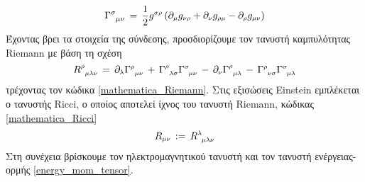 \begin{equation}\label{christoffel symbols identity}
    \Gamma\indices{^\sigma_\mu_\nu} \,=\, \frac{1}{2}\g[i]{\sigma}{\rho}\left( \partial\subscr{\mu}\g{\nu}{\rho} + \partial\subscr{\nu}\g{\rho}{\mu} - \partial\subscr{\rho}\g{\mu}{\nu} \right)
\end{equation}
Έχοντας βρει τα στοιχεία της σύνδεσης, προσδιορίζουμε τον τανυστή καμπυλότητας Riemann με βάση τη σχέση 
\begin{equation}
    \R[\rho]{\mu}[\lambda]{\nu} \,=\, \partial\subscr{\lambda}\Gamma\superscr{\rho}\subscr{\;\;\mu\nu} \,+\, \Gamma\superscr{\rho}\subscr{\;\;\lambda\sigma}\Gamma\superscr{\sigma}\subscr{\;\;\mu\nu} \,-\, \partial\subscr{\nu}\Gamma\superscr{\rho}\subscr{\;\;\mu\lambda} \,-\, \Gamma\superscr{\rho}\subscr{\;\;\nu\sigma}\Gamma\superscr{\sigma}\subscr{\;\;\mu\lambda}
\end{equation}
τρέχοντας τον κώδικα \ref{mathematica_Riemann}. Στις εξισώσεις Einstein εμπλέκεται ο τανυστής Ricci, ο οποίος αποτελεί ίχνος του τανυστή Riemann, κώδικας \ref{mathematica_Ricci}
\begin{equation}
    \R{\mu}{\nu}\,:=\,\R[\lambda]{\mu}[\lambda]{\nu}
\end{equation}
Στη συνέχεια βρίσκουμε τον ηλεκτρομαγνητικού τανυστή και τον τανυστή ενέργειας-ορμής \eqref{energy_mom_tensor}.

